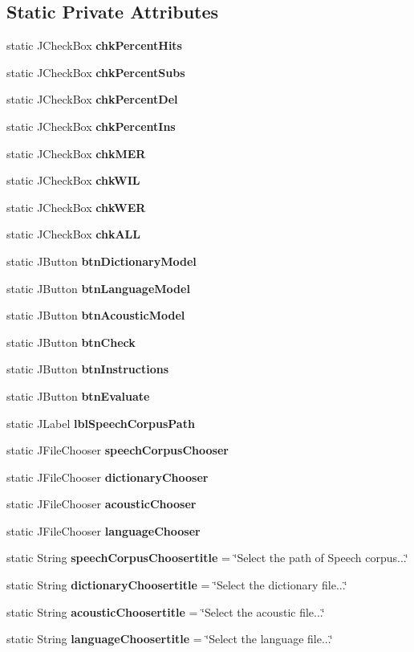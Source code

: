 \subsection*{Static Private Attributes}
\begin{DoxyCompactItemize}
\item 
static J\+Check\+Box {\bf chk\+Percent\+Hits}
\item 
static J\+Check\+Box {\bf chk\+Percent\+Subs}
\item 
static J\+Check\+Box {\bf chk\+Percent\+Del}
\item 
static J\+Check\+Box {\bf chk\+Percent\+Ins}
\item 
static J\+Check\+Box {\bf chk\+M\+E\+R}
\item 
static J\+Check\+Box {\bf chk\+W\+I\+L}
\item 
static J\+Check\+Box {\bf chk\+W\+E\+R}
\item 
static J\+Check\+Box {\bf chk\+A\+L\+L}
\item 
static J\+Button {\bf btn\+Dictionary\+Model}
\item 
static J\+Button {\bf btn\+Language\+Model}
\item 
static J\+Button {\bf btn\+Acoustic\+Model}
\item 
static J\+Button {\bf btn\+Check}
\item 
static J\+Button {\bf btn\+Instructions}
\item 
static J\+Button {\bf btn\+Evaluate}
\item 
static J\+Label {\bf lbl\+Speech\+Corpus\+Path}
\item 
static J\+File\+Chooser {\bf speech\+Corpus\+Chooser}
\item 
static J\+File\+Chooser {\bf dictionary\+Chooser}
\item 
static J\+File\+Chooser {\bf acoustic\+Chooser}
\item 
static J\+File\+Chooser {\bf language\+Chooser}
\item 
static String {\bf speech\+Corpus\+Choosertitle} = \char`\"{}Select the path of Speech corpus...\char`\"{}
\item 
static String {\bf dictionary\+Choosertitle} = \char`\"{}Select the dictionary file...\char`\"{}
\item 
static String {\bf acoustic\+Choosertitle} = \char`\"{}Select the acoustic file...\char`\"{}
\item 
static String {\bf language\+Choosertitle} = \char`\"{}Select the language file...\char`\"{}
\item 

\end{DoxyCompactItemize}
